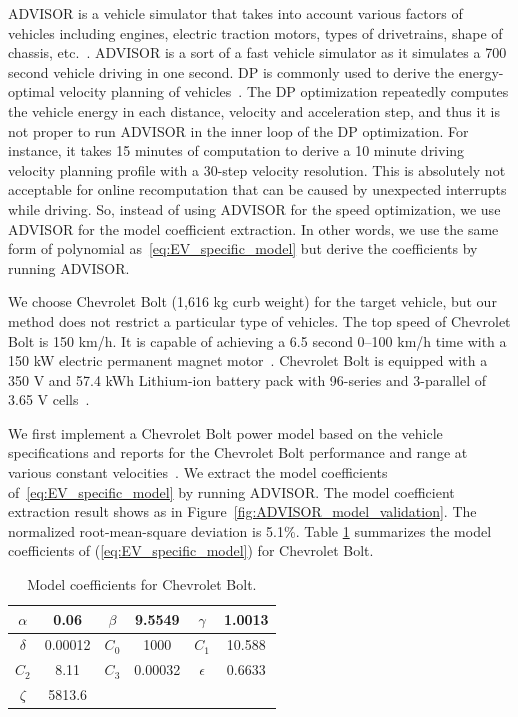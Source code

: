 \documentclass{IEEEtran}
\begin{document}
ADVISOR is a vehicle simulator that takes into account various factors of vehicles including engines, electric traction motors, types of drivetrains, shape of chassis, etc.~\cite{Markel:JPS02}. ADVISOR is a sort of a fast vehicle simulator as it simulates a 700 second vehicle driving in one second. DP is commonly used to derive the energy-optimal velocity planning of vehicles~\cite{Lin:ICCA14,Dib:IVPPC11,Hellstrom:CEP09}. The DP optimization repeatedly computes the vehicle energy in each distance, velocity and acceleration step, and thus it is not proper to run ADVISOR in the inner loop of the DP optimization. For instance, it takes 15 minutes of computation to derive a 10 minute driving velocity planning profile with a 30-step velocity resolution. This is absolutely not acceptable for online recomputation that can be caused by unexpected interrupts while driving. So, instead of using ADVISOR for the speed optimization, we use ADVISOR for the model coefficient extraction. In other words, we use the same form of polynomial as~\eqref{eq:EV_specific_model} but derive the coefficients by running ADVISOR.

We choose Chevrolet Bolt (1,616 kg curb weight) for the target vehicle, but our method does not restrict a particular type of vehicles. The top speed of Chevrolet Bolt is 150 km/h. It is capable of achieving a 6.5 second 0--100 km/h time with a 150 kW electric permanent magnet motor~\cite{GM_Bolt:official}. Chevrolet Bolt is equipped with a 350 V and 57.4 kWh Lithium-ion battery pack with 96-series and 3-parallel of 3.65 V cells~\cite{GM_Bolt:spec}. 

We first implement a Chevrolet Bolt power model based on the vehicle specifications and reports for the Chevrolet Bolt performance and range at various constant velocities~\cite{GM_Bolt:range25mph,GM_Bolt:range65mph,GM_Bolt:range75mph,GM_Bolt:range93mph}. We extract the model coefficients of~\eqref{eq:EV_specific_model} by running ADVISOR. The model coefficient extraction result shows as in Figure~\ref{fig:ADVISOR_model_validation}. The normalized root-mean-square deviation is 5.1\%. Table \ref{table:Coeff_Bolt} summarizes the model coefficients of (\ref{eq:EV_specific_model}) for Chevrolet Bolt. 

\begin{table}
\caption{Model coefficients for Chevrolet Bolt.}
\label{table:Coeff_Bolt}
\centering
\begin{tabular}{|c|c|c|c|c|c|}  \hline
$\alpha$	&0.06		&$\beta$	&9.5549	&$\gamma$	&1.0013	\\ \hline
$\delta$	&0.00012 		&$C_0$	&1000 	&$C_1$		&10.588	\\ \hline
$C_2$	&8.11		&$C_3$	&0.00032	&$\epsilon$	&0.6633	\\ \hline
$\zeta$	&5813.6		\\ \cline{1-2}
\end{tabular}
\end{table}
\end{document}
